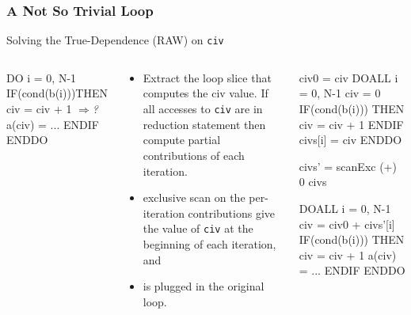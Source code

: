 \documentclass{beamer}
\newcommand{\emp}[1]{\textcolor{DikuRed}{ #1}}
\newcommand{\mymath}[1]{$ #1 $}
\begin{document}
\begin{frame}[fragile,t]
  \frametitle{A Not So Trivial Loop}

\begin{block}{Solving the True-Dependence (RAW) on {\tt civ}} 
\begin{columns} 
\begin{colorcode}
DO i = 0, N-1
 IF(cond(b(i)))THEN 
    civ = civ + 1 \emp{\mymath{\Rightarrow}{\em ?}} 
    a(civ) = ...
ENDIF ENDDO
\end{colorcode}
\begin{scriptsize}
\begin{itemize}
    \item Extract the loop slice that computes the {\sc civ} value.
            If all accesses to {\tt civ} are in reduction statement
            then compute partial contributions of each iteration.
    \item exclusive scan on the per-iteration contributions give
            the value of {\tt civ} at the beginning of each iteration, and
    \item is plugged in the original loop.
\end{itemize}
\end{scriptsize}
\begin{colorcode}
civ0 = civ
DOALL i = 0, N-1
  civ = 0
  IF(cond(b(i))) THEN
    civ = civ + 1
  ENDIF
  civs[i] = civ
ENDDO

civs' = scanExc (+) 0 civs

DOALL i = 0, N-1
  civ = civ0 + civs'[i]
  IF(cond(b(i))) THEN
    civ = civ + 1
    a(civ) = ...
  ENDIF
ENDDO
\end{colorcode}
\end{columns}
\end{block}

\end{frame}
\end{document}
